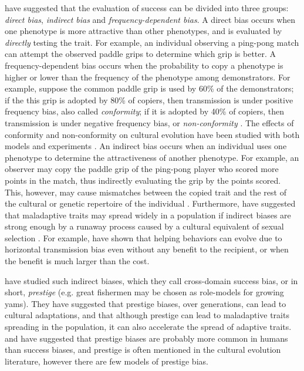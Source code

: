 \documentclass[12pt]{extarticle}
\begin{document}
\citet[Ch.~5]{evolutionBook} have suggested that the evaluation of success can be divided into three groups: \emph{direct bias}, \emph{indirect bias} and \emph{frequency-dependent bias}.
A direct bias occurs when one phenotype is more attractive than other phenotypes, and is evaluated by \emph{directly} testing the trait.
For example, an individual observing a ping-pong match can attempt the observed paddle grips to determine which grip is better.
A frequency-dependent bias occurs when the probability to copy a phenotype is higher or lower than the frequency of the phenotype among demonstrators. 
For example, suppose the common paddle grip is used by 60\% of the demonstrators; if the this grip is adopted by 80\% of copiers, then transmission is under positive frequency bias, also called \emph{conformity}; if it is adopted by 40\% of copiers, then transmission is under negative frequency bias, or \emph{non-conformity} \citep{conformism}. 
The effects of conformity and non-conformity on cultural evolution have been studied with both models \citep{anticonformity,Denton2021,conformity} and experiments \citep{negativeFrequency}.
An indirect bias occurs when an individual uses one phenotype to determine the attractiveness of another phenotype.
For example, an observer may copy the paddle grip of the ping-pong player who scored more points in the match, thus indirectly evaluating the grip by the points scored.
This, however, may cause mismatches between the copied trait and the rest of the cultural or genetic repertoire of the individual \citep{Kolodny2022}.
Furthermore, \citet[Ch. 8]{evolutionBook} have suggested that maladaptive traits may spread widely in a population if indirect biases are strong enough by a runaway process caused by a cultural equivalent of sexual selection \citep{sexualSelectionBook}.
For example, \citet{cooperation} have shown that helping behaviors can evolve due to horizontal transmission bias even without any benefit to the recipient, or when the benefit is much larger than the cost.

\citet{fijian_social_bias} have studied such indirect biases, which they call cross-domain success bias, or in short, \emph{prestige} (e.g. great fishermen may be chosen as role-models for growing yams). They have suggested that prestige biases, over generations, can lead to cultural adaptations, and that although prestige can lead to maladaptive traits spreading in the population, it can also accelerate the spread of adaptive traits.
\citet[Ch.~8]{evolutionBook} and \citet{complexityPaper} have suggested that prestige biases are probably more common in humans than success biases, and prestige is often mentioned in the cultural evolution literature, however there are few models of prestige bias.
\end{document}
